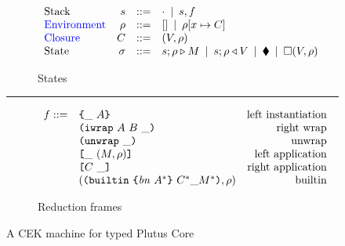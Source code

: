 \documentclass[../plutus-core-specification.tex]{subfiles}
\begin{document}
\begin{figure}[!ht]
\begin{subfigure}[c]{\linewidth}        %
\[
\begin{array}{lrcl}
        \textrm{Stack} & s      & ::= & \cdot \enspace | \enspace s,f    \\
        \textcolor{blue}{ \textrm{Environment}} & \rho & ::= & [] \enspace | \enspace \rho[x \mapsto C] \\
        \textcolor{blue}{ \textrm{Closure}} & C  & ::= & (V,\rho) \\
        \textrm{State} & \sigma & ::= & s;\rho \triangleright M \enspace | \enspace s;\rho \triangleleft V  \enspace | \enspace \blacklozenge{} \enspace | \enspace \square (V,\rho)
    \end{array}
\]
\caption{States}
\end{subfigure}

\vspace{1mm}
\hrule
\vspace{2mm}

\begin{subfigure}[c]{\linewidth}  %
\[
    \begin{array}{rlr}
       f ::= & \texttt{\{}\_ ~ A\texttt{\}}                        & \textrm{left instantiation}\\
             & \texttt{(} \texttt{iwrap} ~ A ~ B ~ \_ \texttt{)}                    & \textrm{right wrap}\\
             & \texttt{(} \texttt{unwrap} ~ \_ \texttt{)}{}                           & \textrm{unwrap}\\
             & \texttt{[} \_ ~ (M,\rho) \texttt{]}                  & \textrm{left application}\\
             & \texttt{[} C ~ \_ \texttt{]}                        & \textrm{right application}\\
             & (\texttt{(} \texttt{builtin} ~ \texttt{\{} \mathit{bn} ~ A^* \texttt{\}} ~ C^* \_ M^* \texttt{)}, \rho)   & \textrm{builtin}\\
    \end{array}
\]
\caption{Reduction frames}
\end{subfigure}

\caption{A CEK machine for typed Plutus Core}
\end{figure}
\end{document}
